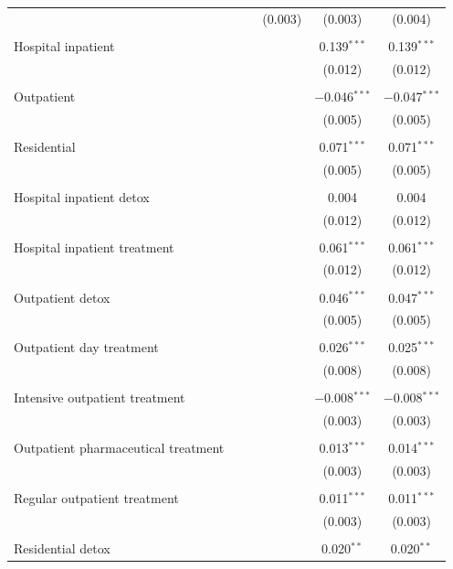 \documentclass[
  12pt,
]{article}
\begin{document}
\begin{table}[!htbp]
\begin{tabular}{@{\extracolsep{0pt}}lccccc}
  &  &  & (0.003) & (0.003) & (0.004) \\ 
  & & & & & \\ 
 Hospital inpatient &  &  &  & 0.139$^{***}$ & 0.139$^{***}$ \\ 
  &  &  &  & (0.012) & (0.012) \\ 
  & & & & & \\ 
 Outpatient &  &  &  & $-$0.046$^{***}$ & $-$0.047$^{***}$ \\ 
  &  &  &  & (0.005) & (0.005) \\ 
  & & & & & \\ 
 Residential &  &  &  & 0.071$^{***}$ & 0.071$^{***}$ \\ 
  &  &  &  & (0.005) & (0.005) \\ 
  & & & & & \\ 
 Hospital inpatient detox &  &  &  & 0.004 & 0.004 \\ 
  &  &  &  & (0.012) & (0.012) \\ 
  & & & & & \\ 
 Hospital inpatient treatment &  &  &  & 0.061$^{***}$ & 0.061$^{***}$ \\ 
  &  &  &  & (0.012) & (0.012) \\ 
  & & & & & \\ 
 Outpatient detox &  &  &  & 0.046$^{***}$ & 0.047$^{***}$ \\ 
  &  &  &  & (0.005) & (0.005) \\ 
  & & & & & \\ 
 Outpatient day treatment &  &  &  & 0.026$^{***}$ & 0.025$^{***}$ \\ 
  &  &  &  & (0.008) & (0.008) \\ 
  & & & & & \\ 
 Intensive outpatient treatment &  &  &  & $-$0.008$^{***}$ & $-$0.008$^{***}$ \\ 
  &  &  &  & (0.003) & (0.003) \\ 
  & & & & & \\ 
 Outpatient pharmaceutical treatment &  &  &  & 0.013$^{***}$ & 0.014$^{***}$ \\ 
  &  &  &  & (0.003) & (0.003) \\ 
  & & & & & \\ 
 Regular outpatient treatment &  &  &  & 0.011$^{***}$ & 0.011$^{***}$ \\ 
  &  &  &  & (0.003) & (0.003) \\ 
  & & & & & \\ 
 Residential detox &  &  &  & 0.020$^{**}$ & 0.020$^{**}$ \\ 

\end{tabular}
\end{table}
\end{document}
